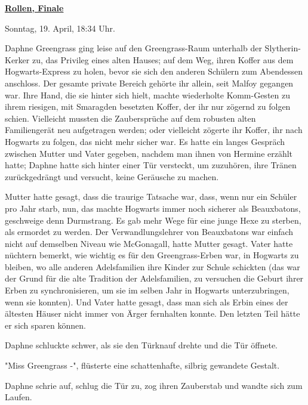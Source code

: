 

\hypertarget{rollen-finale}{%

\textbf{\uline{Rollen, Finale}}

Sonntag, 19. April, 18:34 Uhr.

Daphne Greengrass ging leise auf den Greengrass-Raum unterhalb der Slytherin-Kerker zu, das Privileg eines alten Hauses; auf dem Weg, ihren Koffer aus dem Hogwarts-Express zu holen, bevor sie sich den anderen Schülern zum Abendessen anschloss. Der gesamte private Bereich gehörte ihr allein, seit Malfoy gegangen war. Ihre Hand, die sie hinter sich hielt, machte wiederholte Komm-Gesten zu ihrem riesigen, mit Smaragden besetzten Koffer, der ihr nur zögernd zu folgen schien. Vielleicht mussten die Zaubersprüche auf dem robusten alten Familiengerät neu aufgetragen werden; oder vielleicht zögerte ihr Koffer, ihr nach Hogwarts zu folgen, das nicht mehr sicher war. Es hatte ein langes Gespräch zwischen Mutter und Vater gegeben, nachdem man ihnen von Hermine erzählt hatte; Daphne hatte sich hinter einer Tür versteckt, um zuzuhören, ihre Tränen zurückgedrängt und versucht, keine Geräusche zu machen.

Mutter hatte gesagt, dass die traurige Tatsache war, dass, wenn nur ein Schüler pro Jahr starb, nun, das machte Hogwarts immer noch sicherer als Beauxbatons, geschweige denn Durmstrang. Es gab mehr Wege für eine junge Hexe zu sterben, als ermordet zu werden. Der Verwandlungslehrer von Beauxbatons war einfach nicht auf demselben Niveau wie McGonagall, hatte Mutter gesagt. Vater hatte nüchtern bemerkt, wie wichtig es für den Greengrass-Erben war, in Hogwarts zu bleiben, wo alle anderen Adelsfamilien ihre Kinder zur Schule schickten (das war der Grund für die alte Tradition der Adelsfamilien, zu versuchen die Geburt ihrer Erben zu synchronisieren, um sie im selben Jahr in Hogwarts unterzubringen, wenn sie konnten). Und Vater hatte gesagt, dass man sich als Erbin eines der ältesten Häuser nicht immer von Ärger fernhalten konnte. Den letzten Teil hätte er sich sparen können.

Daphne schluckte schwer, als sie den Türknauf drehte und die Tür öffnete.

"Miss Greengrass -", flüsterte eine schattenhafte, silbrig gewandete Gestalt.

Daphne schrie auf, schlug die Tür zu, zog ihren Zauberstab und wandte sich zum Laufen.

}
